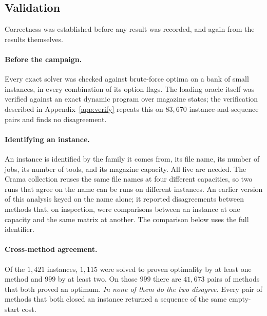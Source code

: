 \subsection{Validation}\label{ssec:validation}

Correctness was established before any result was recorded, and again from the results
themselves.

\paragraph{Before the campaign.}
Every exact solver was checked against brute-force optima on a bank of small instances,
in every combination of its option flags. The loading oracle itself was verified
against an exact dynamic program over magazine states; the verification described in
Appendix~\ref{app:verify} repeats this on $83{,}670$ instance-and-sequence pairs and
finds no disagreement.

\paragraph{Identifying an instance.}
An instance is identified by the family it comes from, its file name, its number of
jobs, its number of tools, and its magazine capacity. All five are needed. The Crama
collection reuses the same file names at four different capacities, so two runs that
agree on the name can be runs on different instances. An earlier version of this
analysis keyed on the name alone; it reported disagreements between methods that, on
inspection, were comparisons between an instance at one capacity and the same matrix at
another. The comparison below uses the full identifier.

\paragraph{Cross-method agreement.}
Of the $1{,}421$ instances, $1{,}115$ were solved to proven optimality by at least one
method and $999$ by at least two. On those $999$ there are $41{,}673$ pairs of methods
that both proved an optimum. \emph{In none of them do the two disagree.} Every pair of
methods that both closed an instance returned a sequence of the same empty-start cost.


